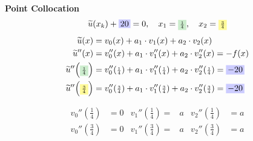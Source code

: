 \documentclass[
final,
a4paper,
oneside,
parskip=full,
headings=standardclasses,
headings=big,
pointednumbers,
fleqn
]{scrartcl}
\newcommand{\tfillb}[1]{\tfillc[#1][blue!20]}
\newcommand{\tfillg}[1]{\tfillc[#1][Green!20]}
\newcommand{\tfilly}[1]{\tfillc[#1][yellow!40]}
\newcommand{\fs}[2]{{\scriptstyle\frac{#1}{#2}}}
\newcommand{\kl}[1]{{\left( #1 \right)}}
\begin{document}
    {\bf{Point Collocation}} \\
    {\setlength{\abovedisplayskip}{-6pt}
    \setlength{\belowdisplayskip}{-12pt}
    \begin{align*}
        \widetilde{u}\kl{x_k} + \tfillb{$20$} = 0, \quad x_1 = \tfillg{$\fs{1}{4}$}, \quad x_2 = \tfilly{$\fs{3}{4}$}
    \end{align*}}
    {\setlength{\abovedisplayskip}{6pt}
    \setlength{\belowdisplayskip}{-12pt}
    \begin{align*}
        \widetilde{u}\kl{x}   &= v_0\kl{x}   + a_1 \cdot v_1\kl{x}   + a_2 \cdot v_2\kl{x} \\
        \widetilde{u}''\kl{x} &= v_0''\kl{x} + a_1 \cdot v_1''\kl{x} + a_2 \cdot v_2''\kl{x} = -f\kl{x} \\
        \widetilde{u}''\kl{\tfillg{$\fs{1}{4}$}} &= v_0''\kl{\fs{1}{4}} + a_1 \cdot v_1''\kl{\fs{1}{4}} + a_2 \cdot v_2''\kl{\fs{1}{4}} = \tfillb{$-20$} \\
        \widetilde{u}''\kl{\tfilly{$\fs{3}{4}$}} &= v_0''\kl{\fs{3}{4}} + a_1 \cdot v_1''\kl{\fs{3}{4}} + a_2 \cdot v_2''\kl{\fs{3}{4}} = \tfillb{$-20$} \\
    \end{align*}}
    \begin{minipage}{0.4\textwidth}
        \setlength{\abovedisplayskip}{-6pt}
        \setlength{\belowdisplayskip}{-12pt}
        \begin{align*}
        v_0''\kl{\fs{1}{4}} &= 0 & v_1''\kl{\fs{1}{4}} =& a & v_2''\kl{\fs{1}{4}} &= a \\
        v_0''\kl{\fs{3}{4}} &= 0 & v_1''\kl{\fs{3}{4}} =& a & v_2''\kl{\fs{3}{4}} &= a \\
        \end{align*}
    \end{minipage}
        
    
\end{document}
